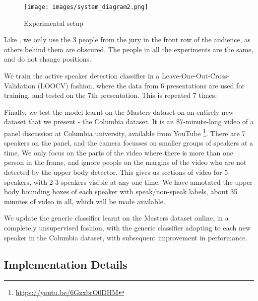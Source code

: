 \documentclass[runningheads]{llncs}
\begin{document}
\begin{figure}[t]
\begin{center}
    \texttt{[image: images/system\_diagram2.png]} 
\end{center}
 \vspace*{-0.6cm} 
   \caption{Experimental setup}
\label{fig:systemDiagram}
 \vspace*{-0.6cm} 
\end{figure}

%
Like \cite{Chakravarty15}, we only use the 3 people from the jury in the front row of the audience, as others behind them are obscured. The people in all the experiments are the same, and do not change positions. 

We train the active speaker detection classifier in a Leave-One-Out-Cross-Validation (LOOCV) fashion, where the data from 6 presentations are used for training, and tested on the 7th presentation. This is repeated 7 times. 

Finally, we test the model learnt on the Masters dataset on an entirely new dataset that we present - the Columbia dataset. It is an 87-minute-long video of a panel discussion at Columbia university, available from YouTube \footnote{\url{https://youtu.be/6GzxbrO0DHM}}. There are 7 speakers on the panel, and the camera focusses on smaller groups of speakers at a time. We only focus on the parts of the video where there is more than one person in the frame, and ignore people on the margins of the video who are not detected by the upper body detector. This gives us sections of video for 5 speakers, with 2-3 speakers visible at any one time. We have annotated the upper body bounding boxes of each speaker with speak/non-speak labels, about 35 minutes of video in all, which will be made available. 

We update the generic classifier learnt on the Masters dataset online, in a completely unsupervised fashion, with the generic classifier adapting to each new speaker in the Columbia dataset, with subsequent improvement in performance.

\subsection{Implementation Details}
\end{document}
